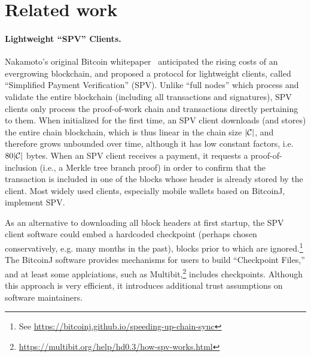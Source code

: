 \section{Related work}

\paragraph{Lightweight ``SPV'' Clients.}
Nakamoto's original Bitcoin whitepaper~\cite{bitcoin} anticipated the rising costs of an evergrowing blockchain, and proposed a protocol for lightweight clients, called ``Simplified Payment Verification'' (SPV). Unlike ``full nodes'' which process and validate the entire blockchain (including all transactions and signatures), SPV clients only process the proof-of-work chain and transactions directly pertaining to them.
When initialized for the first time, an SPV client downloads (and stores) the
entire chain blockchain, which is thus linear in the chain size $|\mathcal{C}|$, and
therefore grows unbounded over time, although it has low constant factors, i.e.
$80|\mathcal{C}|$ bytes.
When an SPV client receives a payment, it requests a proof-of-inclusion (i.e., a Merkle tree branch proof) in order to confirm that the transaction is included in one of the blocks whose header is already stored by the client.
Most widely used clients, especially mobile wallets based on BitcoinJ, implement SPV. 


As an alternative to downloading all block headers at first startup, the SPV client software could embed a hardcoded checkpoint (perhaps chosen conservatively, e.g. many months in the past), blocks prior to which are ignored.\footnote{See \url{https://bitcoinj.github.io/speeding-up-chain-sync}} The BitcoinJ software provides mechanisms for users to build ``Checkpoint Files,'' and at least some applciations, such as Multibit,\footnote{\url{https://multibit.org/help/hd0.3/how-spv-works.html}} includes checkpoints. Although this approach is very efficient, it introduces additional trust assumptions on software maintainers. 


